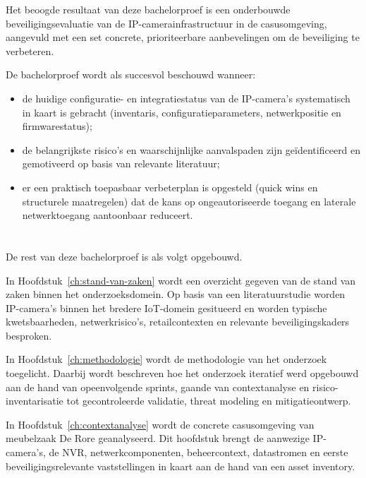Het beoogde resultaat van deze bachelorproef is een onderbouwde beveiligingsevaluatie van de IP-camerainfrastructuur in de casusomgeving, aangevuld met een set concrete, prioriteerbare aanbevelingen om de beveiliging te verbeteren.

De bachelorproef wordt als succesvol beschouwd wanneer:
\begin{itemize}
    \item de huidige configuratie- en integratiestatus van de IP-camera’s systematisch in kaart is gebracht (inventaris, configuratieparameters, netwerkpositie en firmwarestatus);
    \item de belangrijkste risico’s en waarschijnlijke aanvalspaden zijn geïdentificeerd en gemotiveerd op basis van relevante literatuur;
    \item er een praktisch toepasbaar verbeterplan is opgesteld (quick wins en structurele maatregelen) dat de kans op ongeautoriseerde toegang en laterale netwerktoegang aantoonbaar reduceert.
\end{itemize}

\section{}%
\label{sec:opzet-bachelorproef}

De rest van deze bachelorproef is als volgt opgebouwd.

In Hoofdstuk~\ref{ch:stand-van-zaken} wordt een overzicht gegeven van de stand van zaken binnen het onderzoeksdomein. Op basis van een literatuurstudie worden IP-camera's binnen het bredere IoT-domein gesitueerd en worden typische kwetsbaarheden, netwerkrisico's, retailcontexten en relevante beveiligingskaders besproken.

In Hoofdstuk~\ref{ch:methodologie} wordt de methodologie van het onderzoek toegelicht. Daarbij wordt beschreven hoe het onderzoek iteratief werd opgebouwd aan de hand van opeenvolgende sprints, gaande van contextanalyse en risico-inventarisatie tot gecontroleerde validatie, threat modeling en mitigatieontwerp.

In Hoofdstuk~\ref{ch:contextanalyse} wordt de concrete casusomgeving van meubelzaak De Rore geanalyseerd. Dit hoofdstuk brengt de aanwezige IP-camera's, de NVR, netwerkcomponenten, beheercontext, datastromen en eerste beveiligingsrelevante vaststellingen in kaart aan de hand van een asset inventory.

